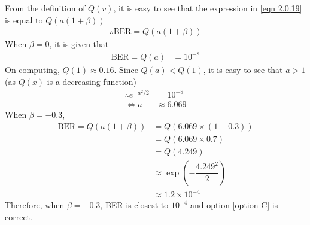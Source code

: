 \documentclass[journal,10pt,twocolumn]{IEEEtran}
\begin{document}
From the definition of $Q(v)$, it is easy to see that the expression in \ref{eqn 2.0.19} is equal to $Q(a(1+\beta))$
\begin{align}
\therefore \text{BER} = Q(a(1+\beta ))
\end{align}
When $\beta = 0$, it is given that 
\begin{align}
\text{BER} = Q(a) &= 10^{-8}
\end{align}
On computing, $Q(1) \approx 0.16$. Since $Q(a)<Q(1)$, it is easy to see that $a>1$ (as $Q(x)$ is a decreasing function)
\begin{align}
\therefore e^{-a^2 / 2} &= 10^{-8}\\
\Leftrightarrow a &\approx 6.069
\end{align}
When $\beta = -0.3$,
\begin{align}
\text{BER} = Q(a(1+\beta)) &= Q(6.069 \times (1-0.3))\\
&= Q(6.069 \times 0.7)\\
&= Q(4.249)\\
&\approx \exp (-\dfrac{4.249^2}{2})\\
&\approx 1.2 \times 10^{-4}
\end{align}
Therefore, when $\beta = -0.3$, BER is closest to $10^{-4}$ and option \ref{option C} is correct.
\end{document}
